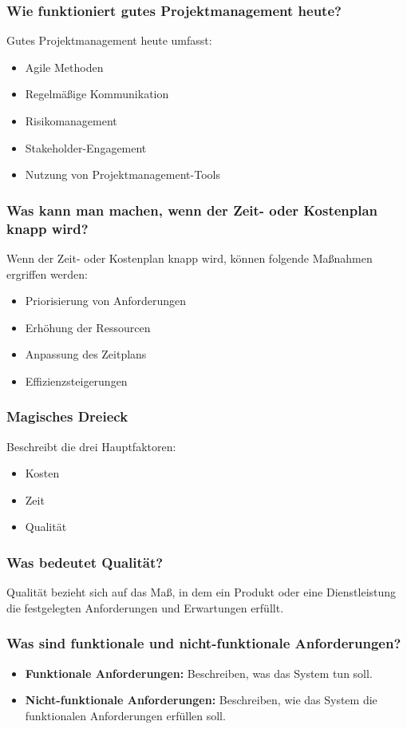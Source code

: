 \documentclass[main.tex]{subfiles}
\begin{document}
\subsubsection*{Wie funktioniert gutes Projektmanagement heute?}
Gutes Projektmanagement heute umfasst:
\begin{itemize}
    \item Agile Methoden
    \item Regelmäßige Kommunikation
    \item Risikomanagement
    \item Stakeholder-Engagement
    \item Nutzung von Projektmanagement-Tools
\end{itemize}


\subsubsection*{Was kann man machen, wenn der Zeit- oder Kostenplan knapp wird?}
Wenn der Zeit- oder Kostenplan knapp wird, können folgende Maßnahmen ergriffen werden:
\begin{itemize}
    \item Priorisierung von Anforderungen
    \item Erhöhung der Ressourcen
    \item Anpassung des Zeitplans
    \item Effizienzsteigerungen
\end{itemize}


\subsubsection*{\gls{Magisches Dreieck}}
Beschreibt die drei Hauptfaktoren:
\begin{itemize}
    \item Kosten
    \item Zeit
    \item Qualität
\end{itemize}


\subsubsection*{Was bedeutet Qualität?}
Qualität bezieht sich auf das Maß, in dem ein Produkt oder eine Dienstleistung die festgelegten Anforderungen und Erwartungen erfüllt.


\subsubsection*{Was sind funktionale und nicht-funktionale Anforderungen?}
\begin{itemize}
    \item \textbf{Funktionale Anforderungen:} Beschreiben, was das System tun soll.
    \item \textbf{Nicht-funktionale Anforderungen:} Beschreiben, wie das System die funktionalen Anforderungen erfüllen soll.
\end{itemize}
\end{document}
